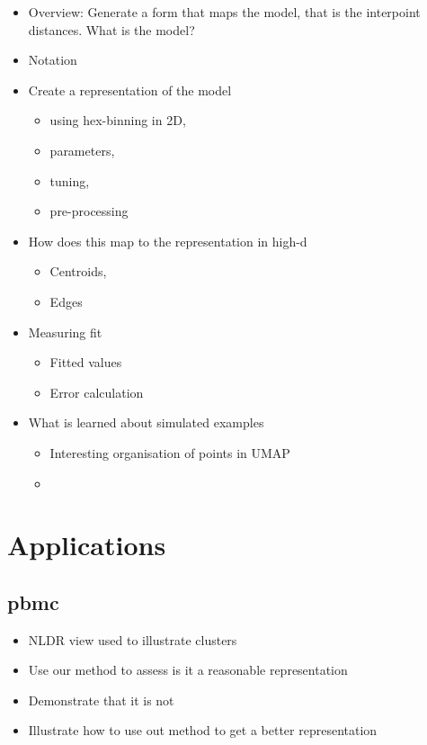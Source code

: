 \documentclass[
  12pt]{article}
\providecommand{\tightlist}{%
  \setlength{\itemsep}{0pt}\setlength{\parskip}{0pt}}\usepackage{longtable,booktabs,array}
\begin{document}
\begin{itemize}
\tightlist
\item
  Overview: Generate a form that maps the model, that is the interpoint
  distances. What is the model?
\item
  Notation
\item
  Create a representation of the model

  \begin{itemize}
  \tightlist
  \item
    using hex-binning in 2D,
  \item
    parameters,
  \item
    tuning,
  \item
    pre-processing
  \end{itemize}
\item
  How does this map to the representation in high-d

  \begin{itemize}
  \tightlist
  \item
    Centroids,
  \item
    Edges
  \end{itemize}
\item
  Measuring fit

  \begin{itemize}
  \tightlist
  \item
    Fitted values
  \item
    Error calculation
  \end{itemize}
\item
  What is learned about simulated examples

  \begin{itemize}
  \tightlist
  \item
    Interesting organisation of points in UMAP
  \item
  \end{itemize}
\end{itemize}

\section{Applications}\label{sec-applications}

\subsection{pbmc}\label{pbmc}

\begin{itemize}
\tightlist
\item
  NLDR view used to illustrate clusters
\item
  Use our method to assess is it a reasonable representation
\item
  Demonstrate that it is not
\item
  Illustrate how to use out method to get a better representation
\end{itemize}
\end{document}
